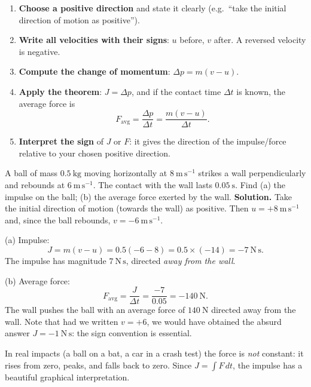 \documentclass[11pt]{article}
\newcounter{popsec}
\newcounter{popsub}
\newcommand{\courssub}[1]{%
  \stepcounter{popsub}%
  \par\vspace{9pt}\noindent{\popxbold\fontsize{11.5}{13}\selectfont\color{popink}{\color{poporange}\thepopsec.\thepopsub}\hspace{6pt}#1}\par\nopagebreak\vspace{4pt}
}
\begin{document}
\begin{methode}
\begin{enumerate}
\item \textbf{Choose a positive direction} and state it clearly (e.g.\ ``take the initial direction of motion as positive'').
\item \textbf{Write all velocities with their signs}: $u$ before, $v$ after. A reversed velocity is negative.
\item \textbf{Compute the change of momentum}: $\Delta p = m(v - u)$.
\item \textbf{Apply the theorem}: $J = \Delta p$, and if the contact time $\Delta t$ is known, the average force is
\[
F_{\text{avg}} = \frac{\Delta p}{\Delta t} = \frac{m(v-u)}{\Delta t}.
\]
\item \textbf{Interpret the sign} of $J$ or $F$: it gives the direction of the impulse/force relative to your chosen positive direction.
\end{enumerate}
\end{methode}

\begin{exoresolu}
A ball of mass $0.5\ \mathrm{kg}$ moving horizontally at $8\ \mathrm{m\,s^{-1}}$ strikes a wall perpendicularly and rebounds at $6\ \mathrm{m\,s^{-1}}$. The contact with the wall lasts $0.05\ \mathrm{s}$. Find (a) the impulse on the ball; (b) the average force exerted by the wall.
\tcblower
\textbf{Solution.} Take the initial direction of motion (towards the wall) as positive. Then $u = +8\ \mathrm{m\,s^{-1}}$ and, since the ball rebounds, $v = -6\ \mathrm{m\,s^{-1}}$.

(a) Impulse:
\[
J = m(v - u) = 0.5(-6 - 8) = 0.5 \times (-14) = -7\ \mathrm{N\,s}.
\]
The impulse has magnitude $7\ \mathrm{N\,s}$, directed \emph{away from the wall}.

(b) Average force:
\[
F_{\text{avg}} = \frac{J}{\Delta t} = \frac{-7}{0.05} = -140\ \mathrm{N}.
\]
The wall pushes the ball with an average force of $140\ \mathrm{N}$ directed away from the wall. Note that had we written $v = +6$, we would have obtained the absurd answer $J = -1\ \mathrm{N\,s}$: the sign convention is essential.
\end{exoresolu}

\courssub{Force--Time Graphs}

In real impacts (a ball on a bat, a car in a crash test) the force is \emph{not} constant: it rises from zero, peaks, and falls back to zero. Since $J = \displaystyle\int F\, dt$, the impulse has a beautiful graphical interpretation.
\end{document}
